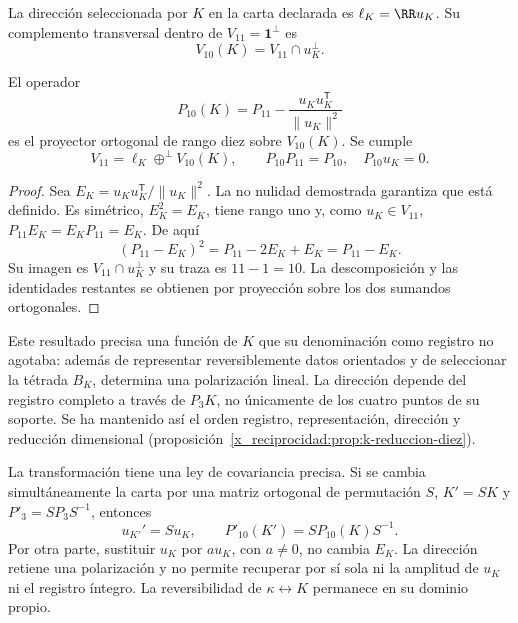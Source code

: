 \begin{definition}
La dirección seleccionada por \(K\) en la carta declarada es
\(\ell_K=\RR u_K\). Su complemento transversal dentro de
\(V_{11}=\mathbf1^\perp\) es
\[
 V_{10}(K)=V_{11}\cap u_K^\perp.
\]
\end{definition}

\begin{proposition}
\label{x_reciprocidad:prop:k-reduccion-diez}
El operador
\begin{equation}
 P_{10}(K)=P_{11}
       -\frac{u_Ku_K^{\mathsf T}}{\lVert u_K\rVert^2}
 \label{x_reciprocidad:eq:k-proyector-diez}
\end{equation}
es el proyector ortogonal de rango diez sobre \(V_{10}(K)\). Se cumple
\[
 V_{11}=\ell_K\mathbin{\oplus^{\perp}}V_{10}(K),
 \qquad P_{10}P_{11}=P_{10},\quad P_{10}u_K=0.
\]
\end{proposition}
\begin{proof}
Sea \(E_K=u_Ku_K^{\mathsf T}/\lVert u_K\rVert^2\). La
no nulidad demostrada garantiza que está definido. Es simétrico,
\(E_K^2=E_K\), tiene rango uno y, como \(u_K\in V_{11}\),
\(P_{11}E_K=E_KP_{11}=E_K\). De aquí
\[
 (P_{11}-E_K)^2=P_{11}-2E_K+E_K=P_{11}-E_K.
\]
Su imagen es \(V_{11}\cap u_K^\perp\) y su traza es
\(11-1=10\). La descomposición y las identidades restantes se
obtienen por proyección sobre los dos sumandos ortogonales.
\end{proof}

Este resultado precisa una función de \(K\) que su denominación como
registro no agotaba: además de representar reversiblemente datos
orientados y de seleccionar la tétrada \(B_K\), determina una
polarización lineal. La dirección depende del registro completo a
través de \(P_3K\), no únicamente de los cuatro puntos de su soporte.
Se ha mantenido así el orden registro, representación, dirección y
reducción dimensional (proposición~\ref{x_reciprocidad:prop:k-reduccion-diez}).

La transformación tiene una ley de covariancia precisa. Si se cambia
simultáneamente la carta por una matriz ortogonal de permutación \(S\),
\(K'=SK\) y \(P'_3=SP_3S^{-1}\), entonces
\[
 u_{K'}'=Su_K,\qquad P'_{10}(K')=SP_{10}(K)S^{-1}.
\]
Por otra parte, sustituir \(u_K\) por \(a u_K\), con \(a\ne0\),
no cambia \(E_K\). La dirección retiene una polarización y no
permite recuperar por sí sola ni la amplitud de \(u_K\) ni el
registro íntegro. La reversibilidad de \(\kappa\leftrightarrow K\)
permanece en su dominio propio.

